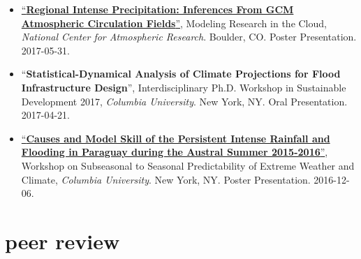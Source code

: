\documentclass[10pt,oneside]{article}
\begin{document}
\begin{itemize}[label={}]
  \item \href{https://doi.org/10.6084/m9.figshare.8277167.v1}{\enquote{\textbf{Regional Intense Precipitation: Inferences From GCM Atmospheric Circulation Fields}}}, Modeling Research in the Cloud,  \textit{National Center for Atmospheric Research}. Boulder, CO. Poster Presentation. 2017-05-31.

  \item \enquote{\textbf{Statistical-Dynamical Analysis of Climate Projections for Flood Infrastructure Design}}, Interdisciplinary Ph.D. Workshop in Sustainable Development 2017,  \textit{Columbia University}. New York, NY. Oral Presentation. 2017-04-21.

  \item \href{https://doi.org/10.13140/RG.2.2.20146.30406}{\enquote{\textbf{Causes and Model Skill of the Persistent Intense Rainfall and Flooding in Paraguay during the Austral Summer 2015-2016}}}, Workshop on Subseasonal to Seasonal Predictability of Extreme Weather and Climate,  \textit{Columbia University}. New York, NY. Poster Presentation. 2016-12-06.

\end{itemize}


\section{peer review}

\mbox{}\vspace{-\dimexpr\baselineskip\relax}
\end{document}
